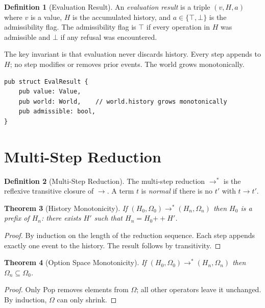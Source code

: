 \documentclass[12pt, a4paper, openany]{book}
\theoremstyle{plain}
\newtheorem{theorem}{Theorem}[chapter]
\theoremstyle{definition}
\newtheorem{definition}[theorem]{Definition}
\theoremstyle{remark}
\begin{document}
\begin{definition}[Evaluation Result]
An \emph{evaluation result} is a triple $(v, H, a)$ where $v$ is a value,
$H$ is the accumulated history, and $a \in \{\top, \bot\}$ is the admissibility
flag. The admissibility flag is $\top$ if every operation in $H$ was admissible
and $\bot$ if any refusal was encountered.
\end{definition}

The key invariant is that evaluation never discards history. Every step appends
to $H$; no step modifies or removes prior events. The world grows monotonically.

\begin{lstlisting}[style=rust, caption={Evaluation result preserving all history}]
pub struct EvalResult {
    pub value: Value,
    pub world: World,    // world.history grows monotonically
    pub admissible: bool,
}
\end{lstlisting}

\section{Multi-Step Reduction}

\begin{definition}[Multi-Step Reduction]
The multi-step reduction $\to^*$ is the reflexive transitive closure of $\to$.
A term $t$ is \emph{normal} if there is no $t'$ with $t \to t'$.
\end{definition}

\begin{theorem}[History Monotonicity]
If $(H_0, \Omega_0) \to^* (H_n, \Omega_n)$ then $H_0$ is a prefix of $H_n$:
there exists $H'$ such that $H_n = H_0 \mathbin{++} H'$.
\end{theorem}

\begin{proof}
By induction on the length of the reduction sequence. Each step appends exactly
one event to the history. The result follows by transitivity.
\end{proof}

\begin{theorem}[Option Space Monotonicity]
If $(H_0, \Omega_0) \to^* (H_n, \Omega_n)$ then $\Omega_n \subseteq \Omega_0$.
\end{theorem}

\begin{proof}
Only Pop removes elements from $\Omega$; all other operators leave it unchanged.
By induction, $\Omega$ can only shrink.
\end{proof}
\end{document}
